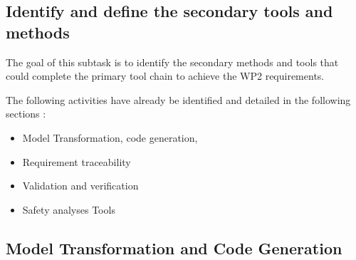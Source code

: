 \documentclass{template/openetcs_article}
\begin{document}
\subsection{Identify and define the secondary tools and methods}


The goal of this subtask  is to identify  the secondary methods and tools that could complete the primary tool chain to  achieve the WP2 requirements.

The following activities  have already be identified and detailed in the following sections :

\begin{itemize}
\item Model Transformation, code generation,
\item Requirement traceability
\item Validation and verification
\item Safety analyses Tools
\end{itemize}



\subsection{Model Transformation and Code Generation}
\end{document}
